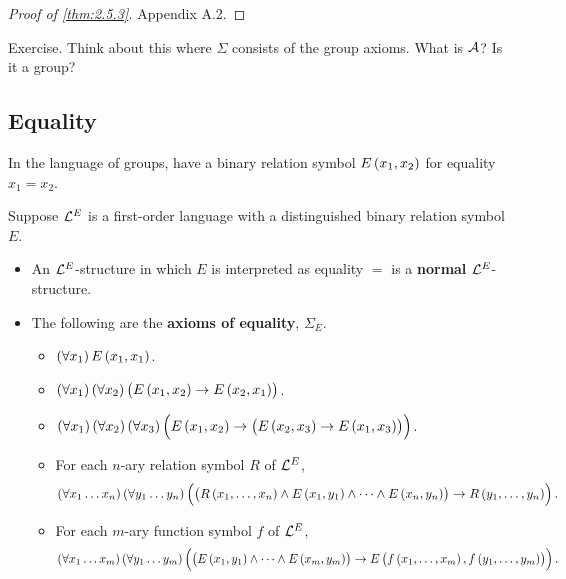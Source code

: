 \begin{proof}[Proof of \ref{thm:2.5.3}]
Appendix A.2.
\end{proof}

\begin{example*}
Exercise. Think about this where $ \Sigma $ consists of the group axioms. What is $ \AA $? Is it a group?
\end{example*}


\subsection{Equality}

\begin{example*}
In the language of groups, have a binary relation symbol $ E\br{x_1, x_2} $ for equality $ x_1 = x_2 $.
\end{example*}

\begin{definition}
Suppose $ \LL^E $ is a first-order language with a distinguished binary relation symbol $ E $.
\begin{itemize}
\item An $ \LL^E $-structure in which $ E $ is interpreted as equality $ = $ is a \textbf{normal} $ \LL^E $-structure.
\item The following are the \textbf{axioms of equality}, $ \Sigma_E $.
\begin{itemize}
\item $ \fab{x_1}E\br{x_1, x_1} $.
\item $ \fab{x_1}\fab{x_2}\impb{E\br{x_1, x_2}}{E\br{x_2, x_1}} $.
\item $ \fab{x_1}\fab{x_2}\fab{x_3}\impb{E\br{x_1, x_2}}{\impb{E\br{x_2, x_3}}{E\br{x_1, x_3}}} $.
\item For each $ n $-ary relation symbol $ R $ of $ \LL^E $,
$$ \fab{x_1 \dots x_n}\fab{y_1 \dots y_n}\impb{\br{R\br{x_1, \dots, x_n} \land E\br{x_1, y_1} \land \dots \land E\br{x_n, y_n}}}{R\br{y_1, \dots, y_n}}. $$
\item For each $ m $-ary function symbol $ f $ of $ \LL^E $,
$$ \fab{x_1 \dots x_m}\fab{y_1 \dots y_m}\impb{\br{E\br{x_1, y_1} \land \dots \land E\br{x_m, y_m}}}{E\br{f\br{x_1, \dots, x_m}, f\br{y_1, \dots, y_m}}}. $$
\end{itemize}
\end{itemize}
\end{definition}

\pagebreak

